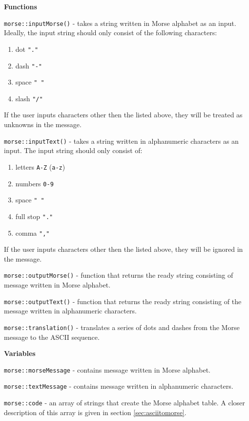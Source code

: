 \documentclass[12pt]{report}
\begin{document}
\textbf{Functions}

\verb|morse::inputMorse()| - takes a string written in Morse alphabet as an input. Ideally, the input string should only consist of the following characters:

\begin{enumerate}
\item dot \verb|"."|

\item dash \verb|"-"|

\item space \verb|" "|

\item slash \verb|"/"|
\end{enumerate}

If the user inputs characters other then the listed above, they will be treated as unknowns in the message.

\verb|morse::inputText()| - takes a string written in alphanumeric characters as an input. The input string should only consist of:

\begin{enumerate}
\item letters \verb|A-Z| (\verb|a-z|)
\item numbers \verb|0-9|
\item space \verb|" "|
\item full stop \verb|"."|
\item comma \verb|","|
\end{enumerate}

If the user inputs characters other then the listed above, they will be ignored in the message.

\verb|morse::outputMorse()| - function that returns the ready string consisting of message written in Morse alphabet.

\verb|morse::outputText()| - function that returns the ready string consisting of the message written in alphanumeric characters.

\verb|morse::translation()| - translates a series of dots and dashes from the Morse message to the ASCII sequence.

\textbf{Variables}

\verb|morse::morseMessage| - contains message written in Morse alphabet.

\verb|morse::textMessage| - contains message written in alphanumeric characters.

\verb|morse::code| - an array of strings that create the Morse alphabet table. A closer description of this array is given in section \ref{sec:asciitomorse}.
\end{document}
